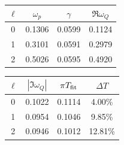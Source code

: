 \documentclass[UTF8,fontset=fandol,12pt,a4paper,oneside,openany]{ctexrep}
\begin{document}
\noindent\begin{minipage}{\linewidth}
\captionsetup{type=table}\caption{轴对称共振峰、QNM 比较及描述性宽度。}\label{audit:tab:fit}
\centering\fontsize{10.5}{14}\selectfont
\setlength{\tabcolsep}{6pt}\renewcommand{\arraystretch}{1.2}
\par{}\par\smallskip
\begin{tabular}{cccc}\toprule
$\ell$ & $\omega_p$ & $\gamma$ & $\Re\omega_Q$\\\midrule
0 & 0.1306 & 0.0599 & 0.1124\\
1 & 0.3101 & 0.0591 & 0.2979\\
2 & 0.5026 & 0.0595 & 0.4920\\
\bottomrule\end{tabular}
\par\medskip
\par{}\par\smallskip
\begin{tabular}{cccc}\toprule
$\ell$ & $|\Im\omega_Q|$ & $\pi T_{\rm fit}$ & $\Delta T$\\\midrule
0 & 0.1022 & 0.1114 & 4.00\%\\
1 & 0.0954 & 0.1046 & 9.85\%\\
2 & 0.0946 & 0.1012 & 12.81\%\\
\bottomrule\end{tabular}
\end{minipage}\par\addvspace{10pt}
\par\addvspace{14pt}
\end{document}
